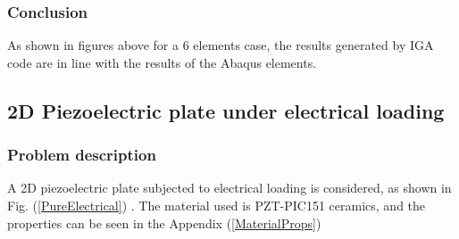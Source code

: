 \documentclass[11pt]{article}
\begin{document}
\subsubsection{Conclusion}
As shown in figures above for a 6 elements case, the results generated by IGA code are in line with the results of the Abaqus elements.  





\subsection{2D Piezoelectric plate under electrical loading}
\subsubsection{Problem description} \label{2DPPWEL}
A 2D piezoelectric plate subjected to electrical loading is considered, as shown in Fig. (\ref{PureElectrical}) . The material used is PZT-PIC151 ceramics, and the properties can be seen in the Appendix (\ref{MaterialProps})
\end{document}
